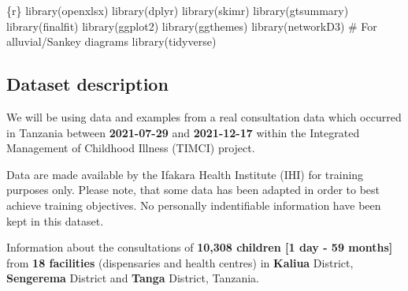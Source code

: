 \documentclass[
  letterpaper,
  DIV=11,
  numbers=noendperiod]{scrreprt}
\newenvironment{Shaded}{\begin{snugshade}}{\end{snugshade}}
\newcommand{\CommentTok}[1]{\textcolor[rgb]{0.37,0.37,0.37}{#1}}
\newcommand{\FunctionTok}[1]{\textcolor[rgb]{0.28,0.35,0.67}{#1}}
\newcommand{\InformationTok}[1]{\textcolor[rgb]{0.37,0.37,0.37}{#1}}
\newcommand{\NormalTok}[1]{\textcolor[rgb]{0.00,0.23,0.31}{#1}}
\begin{document}
\begin{Shaded}
\begin{Highlighting}[]
\InformationTok{\textasciigrave{}\textasciigrave{}\textasciigrave{}\{r\}}
\FunctionTok{library}\NormalTok{(openxlsx)}
\FunctionTok{library}\NormalTok{(dplyr)}
\FunctionTok{library}\NormalTok{(skimr)}
\FunctionTok{library}\NormalTok{(gtsummary)}
\FunctionTok{library}\NormalTok{(finalfit)}
\FunctionTok{library}\NormalTok{(ggplot2)}
\FunctionTok{library}\NormalTok{(ggthemes)}
\FunctionTok{library}\NormalTok{(networkD3) }\CommentTok{\# For alluvial/Sankey diagrams}
\FunctionTok{library}\NormalTok{(tidyverse)}
\InformationTok{\textasciigrave{}\textasciigrave{}\textasciigrave{}}
\end{Highlighting}
\end{Shaded}

\hypertarget{dataset-description}{%
\subsection{Dataset description}\label{dataset-description}}

We will be using data and examples from a real consultation data which
occurred in Tanzania between \textbf{2021-07-29} and \textbf{2021-12-17}
within the Integrated Management of Childhood Illness (TIMCI) project.

\begin{tcolorbox}[enhanced jigsaw, colframe=quarto-callout-important-color-frame, colback=white, rightrule=.15mm, bottomrule=.15mm, left=2mm, arc=.35mm, coltitle=black, title=\textcolor{quarto-callout-important-color}{\faExclamation}\hspace{0.5em}{Important}, opacitybacktitle=0.6, bottomtitle=1mm, opacityback=0, toptitle=1mm, toprule=.15mm, colbacktitle=quarto-callout-important-color!10!white, titlerule=0mm, leftrule=.75mm, breakable]
Data are made available by the Ifakara Health Institute (IHI) for
training purposes only. Please note, that some data has been adapted in
order to best achieve training objectives. No personally indentifiable
information have been kept in this dataset.
\end{tcolorbox}

Information about the consultations of \textbf{10,308 children {[}1 day
- 59 months{]}} from \textbf{18 facilities} (dispensaries and health
centres) in \textbf{Kaliua} District, \textbf{Sengerema} District and
\textbf{Tanga} District, Tanzania.
\end{document}
